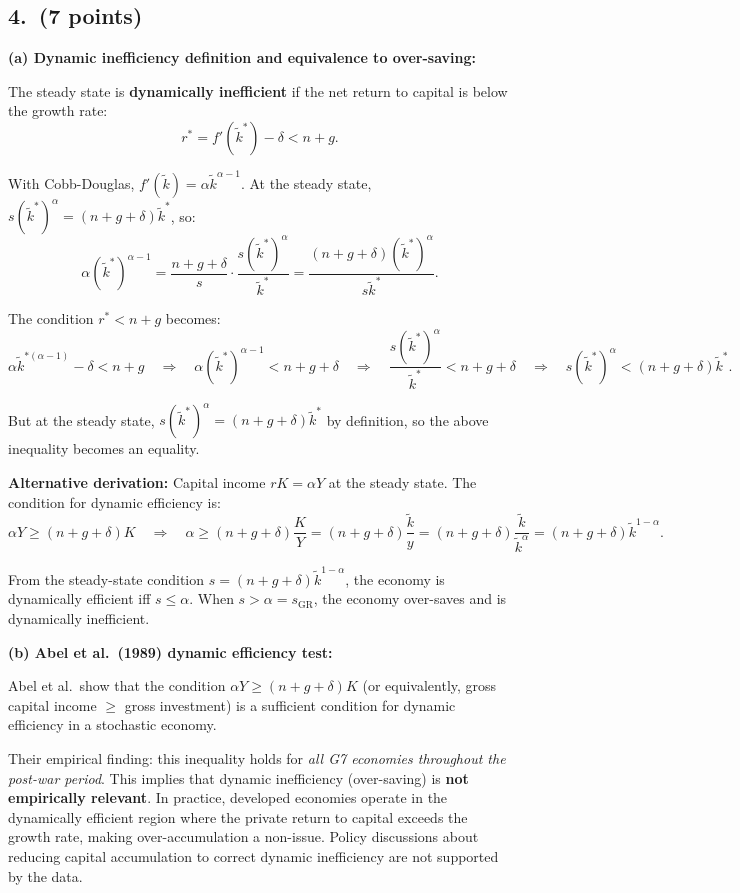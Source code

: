 \documentclass[a4paper,11pt]{article}
\newcommand{\ktilde}{\tilde{k}}
\begin{document}
\subsection*{4.\ (7 points)}

\begin{answerbox}
\textbf{(a) Dynamic inefficiency definition and equivalence to over-saving:}

The steady state is \textbf{dynamically inefficient} if the net return to capital is below the growth rate:
\[
    r^* = f'(\ktilde^*) - \delta < n + g.
\]

With Cobb-Douglas, $f'(\ktilde) = \alpha\ktilde^{\alpha-1}$. At the steady state, $s(\ktilde^*)^\alpha = (n+g+\delta)\ktilde^*$, so:
\[
    \alpha(\ktilde^*)^{\alpha-1} = \frac{n+g+\delta}{s}\cdot\frac{s(\ktilde^*)^\alpha}{\ktilde^*} = \frac{(n+g+\delta)(\ktilde^*)^\alpha}{s\ktilde^*}.
\]

The condition $r^* < n+g$ becomes:
\[
    \alpha\ktilde^{*(\alpha-1)} - \delta < n+g
    \quad\Longrightarrow\quad
    \alpha(\ktilde^*)^{\alpha-1} < n+g+\delta
    \quad\Longrightarrow\quad
    \frac{s(\ktilde^*)^\alpha}{\ktilde^*} < n+g+\delta
    \quad\Longrightarrow\quad
    s(\ktilde^*)^\alpha < (n+g+\delta)\ktilde^*.
\]

But at the steady state, $s(\ktilde^*)^\alpha = (n+g+\delta)\ktilde^*$ by definition, so the above inequality becomes an equality.

\textbf{Alternative derivation:} Capital income $rK = \alpha Y$ at the steady state. The condition for dynamic efficiency is:
\[
    \alpha Y \geq (n+g+\delta)K
    \quad\Longrightarrow\quad
    \alpha \geq (n+g+\delta)\frac{K}{Y} = (n+g+\delta)\frac{\ktilde}{y} = (n+g+\delta)\frac{\ktilde}{\ktilde^\alpha} = (n+g+\delta)\ktilde^{1-\alpha}.
\]

From the steady-state condition $s = (n+g+\delta)\ktilde^{1-\alpha}$, the economy is dynamically efficient iff $s \leq \alpha$.  When $s > \alpha = s_{\mathrm{GR}}$, the economy over-saves and is dynamically inefficient. \checkmark

\textbf{(b) Abel et al.\ (1989) dynamic efficiency test:}

Abel et al.\ show that the condition $\alpha Y \geq (n+g+\delta)K$ (or equivalently, gross capital income $\geq$ gross investment) is a sufficient condition for dynamic efficiency in a stochastic economy.

Their empirical finding: this inequality holds for \emph{all G7 economies throughout the post-war period}. This implies that dynamic inefficiency (over-saving) is \textbf{not empirically relevant}. In practice, developed economies operate in the dynamically efficient region where the private return to capital exceeds the growth rate, making over-accumulation a non-issue. Policy discussions about reducing capital accumulation to correct dynamic inefficiency are not supported by the data.


\end{answerbox}
\end{document}
